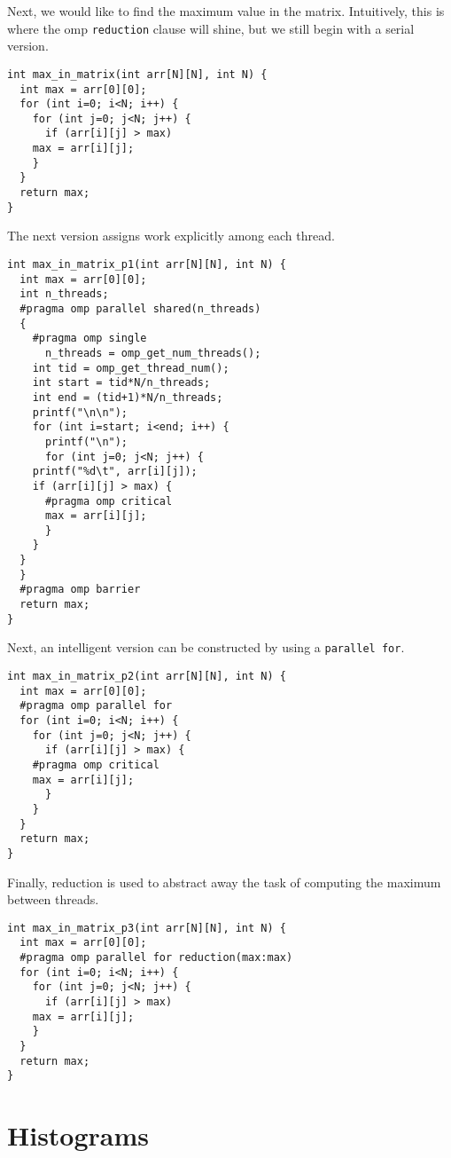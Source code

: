 \documentclass[11pt]{article}
\begin{document}
Next, we would like to find the maximum value in the
matrix. Intuitively, this is where the omp \verb~reduction~ clause will
shine, but we still begin with a serial version.

\begin{verbatim}
int max_in_matrix(int arr[N][N], int N) {
  int max = arr[0][0];
  for (int i=0; i<N; i++) {
    for (int j=0; j<N; j++) {
      if (arr[i][j] > max)
	max = arr[i][j];
    }
  }
  return max;
}
\end{verbatim}

The next version assigns work explicitly among each thread.

\begin{verbatim}
int max_in_matrix_p1(int arr[N][N], int N) {
  int max = arr[0][0];
  int n_threads;
  #pragma omp parallel shared(n_threads)
  {
    #pragma omp single
      n_threads = omp_get_num_threads();
    int tid = omp_get_thread_num();
    int start = tid*N/n_threads;
    int end = (tid+1)*N/n_threads;
    printf("\n\n");
    for (int i=start; i<end; i++) {
      printf("\n");
      for (int j=0; j<N; j++) {
	printf("%d\t", arr[i][j]);
	if (arr[i][j] > max) {
	  #pragma omp critical
	  max = arr[i][j];
      }
    }
  }
  }
  #pragma omp barrier
  return max;
}
\end{verbatim}

Next, an intelligent version can be constructed by using a \verb~parallel for~.

\begin{verbatim}
int max_in_matrix_p2(int arr[N][N], int N) {
  int max = arr[0][0];
  #pragma omp parallel for
  for (int i=0; i<N; i++) {
    for (int j=0; j<N; j++) {
      if (arr[i][j] > max) {
	#pragma omp critical
	max = arr[i][j];
      }
    }
  }
  return max;
}
\end{verbatim}

Finally, reduction is used to abstract away the task of computing the
maximum between threads.

\begin{verbatim}
int max_in_matrix_p3(int arr[N][N], int N) {
  int max = arr[0][0];
  #pragma omp parallel for reduction(max:max)
  for (int i=0; i<N; i++) {
    for (int j=0; j<N; j++) {
      if (arr[i][j] > max)
	max = arr[i][j];
    }
  }
  return max;
}
\end{verbatim}

\section{Histograms}
\label{sec-3}
\end{document}
